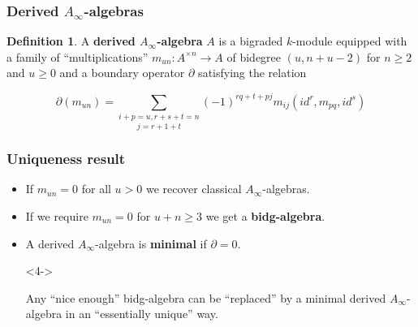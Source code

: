 \documentclass{beamer}
\theoremstyle{definition}
\newtheorem{defi}{Definition}
\begin{document}
\begin{frame}
\frametitle{Derived $A_\infty$-algebras}
\begin{defi}
A \textbf{derived $A_\infty$-algebra} $A$ is a bigraded $k$-module equipped with a family of ``multiplications'' $m_{un}:A^{\times n}\to A$ of bidegree $(u,n+u-2)$ for $n\geq 2$ and $u\geq 0$  and a boundary operator $\partial$ satisfying the relation

\[\partial(m_{un})=\underset{j=r+1+t}{\sum_{i+p=u,r+s+t=n}}(-1)^{rq+t+pj}m_{ij}(id^{ r}, m_{pq}, id^{ s})\] %
\end{defi}
\end{frame}


\begin{frame}
\frametitle{Uniqueness result}
\begin{itemize}
\item If $m_{un}=0$ for all $u>0$ we recover classical $A_\infty$-algebras.
\item<2-> If we require $m_{un}=0$ for $u+n\geq 3$ we get a \textbf{bidg-algebra}. %
\item<3-> A derived $A_\infty$-algebra is \textbf{minimal} if $\partial=0$. 
\item[]<4->
\begin{theorem}[Sagave]
Any ``nice enough'' bidg-algebra can be ``replaced'' by a minimal derived $A_\infty$-algebra in an ``essentially unique'' way.
\end{theorem}
\end{itemize}
\end{frame}
\end{document}
